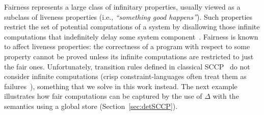 \documentclass[main.tex]{subfiles}
\begin{document}
Fairness represents a large class of infinitary properties, usually viewed as a subclass of liveness properties (i.e., \emph{``something good happens''}). Such properties restrict the set of potential computations of a system by disallowing those infinite computations that indefinitely delay some system component~\cite{fairness}. 
Fairness is known to affect liveness properties: the correctness of a program with respect to some property cannot be proved unless its infinite computations are restricted to just the fair ones.  Unfortunately, transition rules defined in classical SCCP~\cite{scc} do not consider infinite computations (crisp constraint-languages often treat them as failures~\cite{fairness}), something that we solve in this work instead. The next example illustrates how fair computations can be  captured by the use of $\Delta$ with the semantics using a global store (Section~\ref{sec:detSCCP}). 
\end{document}
